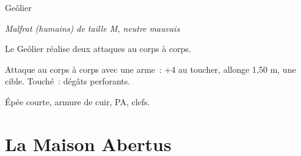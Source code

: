 \documentclass[a4paper,10pt,openany]{book}
\begin{document}
\begin{multicols}{2}
\begin{monsterbox}{Geôlier}
	\begin{hangingpar}
		\textit{Malfrat (humains) de taille M, neutre mauvais}
	\end{hangingpar}
	\dndline%
	\basics[%
	armorclass = 11 (armure de cuir),
	hitpoints  = \dice{5d8 + 10},
	speed      = 9 m
	]
	\dndline%
	\stats[
	STR = \stat{15},
	DEX = \stat{11},
	CON = \stat{14},
	CHA = \stat{8}
	]
	\dndline%
	\details[%
	skills= Intimidation +2,
	senses= Perception passive 10,
	languages = bas-thrain,
	challenge= 1/2
	]
	\dndline%
	\begin{monsteraction}
		Le Geôlier réalise deux attaques au corps à corps.
	\end{monsteraction}
	\begin{monsteraction}
		Attaque au corps à corps avec une arme : +4 au toucher, allonge 1,50 m, une cible. Touché :  dégâts perforants.
	\end{monsteraction}
	\dndline%
	\begin{monsteraction}[Possessions]
		Épée courte, armure de cuir,  PA, clefs.
	\end{monsteraction}
\end{monsterbox}

\end{multicols}

\chapter{La Maison Abertus}
\end{document}
